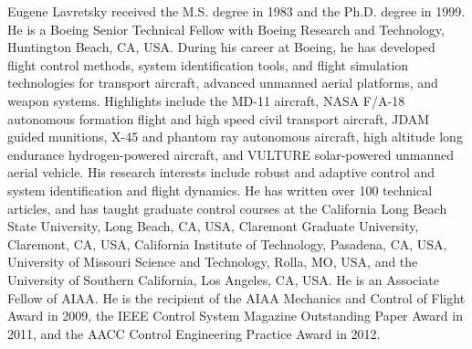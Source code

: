 \documentclass[journal]{IEEEtran}
\newcommand{\figurepath}{../fig/bio}
\begin{document}
\begin{multicols}{2}
    \begin{IEEEbiography}{Eugene Lavretsky}
      received the M.S. degree in 1983 and the Ph.D. degree in 1999.
      He is a Boeing Senior Technical Fellow with Boeing Research and Technology, Huntington Beach, CA, USA.\@
      During his career at Boeing, he has developed flight control methods, system identification tools, and flight simulation technologies for transport aircraft, advanced unmanned aerial platforms, and weapon systems.
      Highlights include the MD-11 aircraft, NASA F/A-18 autonomous formation flight and high speed civil transport aircraft, JDAM guided munitions, X-45 and phantom ray autonomous aircraft, high altitude long endurance hydrogen-powered aircraft, and VULTURE solar-powered unmanned aerial vehicle.
      His research interests include robust and adaptive control and system identification and flight dynamics.
      He has written over 100 technical articles, and has taught graduate control courses at the California Long Beach State University, Long Beach, CA, USA, Claremont Graduate University, Claremont, CA, USA, California Institute of Technology, Pasadena, CA, USA, University of Missouri Science and Technology, Rolla, MO, USA, and the University of Southern California, Los Angeles, CA, USA.\@
      He is an Associate Fellow of AIAA.\@
      He is the recipient of the AIAA Mechanics and Control of Flight Award in 2009, the IEEE Control System Magazine Outstanding Paper Award in 2011, and the AACC Control Engineering Practice Award in 2012.
    \end{IEEEbiography}

  \end{multicols}
\end{document}
